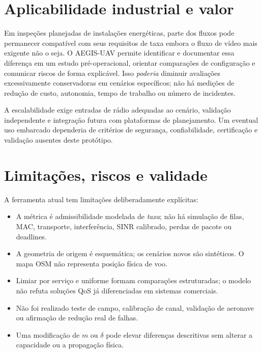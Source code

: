 \documentclass[10pt,a4paper,twocolumn]{article}
\begin{document}
\section{Aplicabilidade industrial e valor}
Em inspeções planejadas de instalações energéticas, parte dos fluxos pode permanecer compatível com seus requisitos de taxa embora o fluxo de vídeo mais exigente não o seja. O AEGIS-UAV permite identificar e documentar essa diferença em um estudo pré-operacional, orientar comparações de configuração e comunicar riscos de forma explicável. Isso \emph{poderia} diminuir avaliações excessivamente conservadoras em cenários específicos; não há medições de redução de custo, autonomia, tempo de trabalho ou número de incidentes.

A escalabilidade exige entradas de rádio adequadas ao cenário, validação independente e integração futura com plataformas de planejamento. Um eventual uso embarcado dependeria de critérios de segurança, confiabilidade, certificação e validação ausentes deste protótipo.

\section{Limitações, riscos e validade}
A ferramenta atual tem limitações deliberadamente explícitas: \begin{itemize}
\item A métrica é admissibilidade modelada de \emph{taxa}; não há simulação de filas, MAC, transporte, interferência, SINR calibrado, perdas de pacote ou deadlines.
\item A geometria de origem é esquemática; os cenários novos são sintéticos. O mapa OSM não representa posição física de voo.
\item Limiar por serviço e uniforme formam comparações estruturadas; o modelo não refuta soluções QoS já diferenciadas em sistemas comerciais.
\item Não foi realizado teste de campo, calibração de canal, validação de aeronave ou afirmação de redução real de falhas.
\item Uma modificação de $m$ ou $\delta$ pode elevar diferenças descritivas sem alterar a capacidade ou a propagação física.
\end{itemize}
\end{document}
